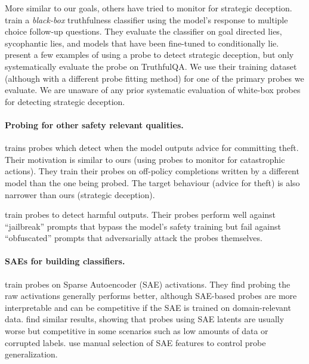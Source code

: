 More similar to our goals, others have tried to monitor for strategic deception.
\citet{Pacchiardi2023_ailiar} train a \emph{black-box} truthfulness classifier using the model's
response to multiple choice follow-up questions.
They evaluate the classifier on goal directed lies, sycophantic lies, and models that have been fine-tuned to
conditionally lie.
\citet{Zou2023_repe} present a few examples of using a probe to detect strategic deception, but only
systematically evaluate the probe on TruthfulQA.
We use their training dataset (although with a different probe fitting method) for one of the primary probes we evaluate.
We are unaware of any prior systematic evaluation of white-box probes for detecting strategic deception.

\paragraph{Probing for other safety relevant qualities.} \citet{Roger2023_coup} trains probes which detect when the model outputs advice for
committing theft. Their motivation is similar to ours (using probes to monitor for catastrophic actions).
They train their probes on off-policy completions written by a different model than the one being probed.
The target behaviour (advice for theft) is also narrower than ours (strategic deception).


\citet{Bailey2024_obfuscated} train probes to detect harmful outputs.
Their probes perform well against \enquote{jailbreak} prompts that bypass the model's safety training but fail against \enquote{obfuscated} prompts that adversarially attack the probes themselves.

\paragraph{SAEs for building classifiers.} \citet{Bricken2024_saeclassifiers} train probes on Sparse Autoencoder (SAE) activations.
They find probing the raw activations generally performs better, although SAE-based probes are more interpretable and can be competitive if the SAE is trained on domain-relevant data.
\citet{Kantamneni2024_saeprobing} find similar results, showing that probes using SAE latents are usually worse but competitive in some scenarios such as low amounts of data or corrupted labels.
\citet{Marks2024_sparse} use manual selection of SAE features to control probe generalization.